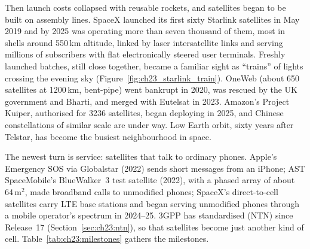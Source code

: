 Then launch costs collapsed with reusable rockets, and satellites began to be built on assembly
lines. SpaceX launched its first sixty Starlink satellites in May 2019 and by 2025 was operating
more than seven thousand of them, most in shells around 550\,km altitude, linked by laser
intersatellite links and serving millions of subscribers with flat electronically steered
user terminals. Freshly launched batches, still close together, became a familiar sight as
``trains'' of lights crossing the evening sky (Figure~\ref{fig:ch23_starlink_train}). OneWeb (about
650 satellites at 1200\,km, bent-pipe) went bankrupt in 2020, was rescued by the UK government and
Bharti, and merged with Eutelsat in 2023. Amazon's Project Kuiper, authorised for 3236 satellites,
began deploying in 2025, and Chinese constellations of similar scale are under way. Low Earth
orbit, sixty years after Telstar, has become the busiest neighbourhood in space.


The newest turn is  service: satellites that talk to ordinary phones.
Apple's Emergency SOS via Globalstar (2022) sends short messages from an iPhone; AST
SpaceMobile's BlueWalker~3 test satellite (2022), with a phased array of about 64\,m$^2$, made
broadband calls to unmodified phones; SpaceX's direct-to-cell satellites carry LTE base stations
and began serving unmodified phones through a mobile operator's spectrum in 2024--25. 3GPP has
standardised  (NTN) since Release~17
(Section~\ref{sec:ch23:ntn}), so that satellites become just another kind of cell.
Table~\ref{tab:ch23:milestones} gathers the milestones.

